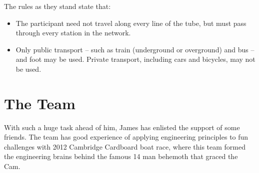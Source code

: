 \documentclass[a4paper,11pt]{article}  %
\begin{document}
The rules as they stand state that:
\begin{itemize}
\item The participant need not travel along every line of the tube,
  but must pass through every station in the network.
  \item Only public transport -- such as train (underground or
    overground) and bus -- and foot may be used. Private transport,
    including cars and bicycles, may not be used.
\end{itemize}

\section*{The Team}

With such a huge task ahead of him, James has enlisted the support of
some friends. The team has good experience of applying engineering
principles to fun challenges with 2012 Cambridge Cardboard boat race,
where this team formed the engineering brains behind the famous 14 man
behemoth that graced the Cam.

\bigskip
\end{document}
